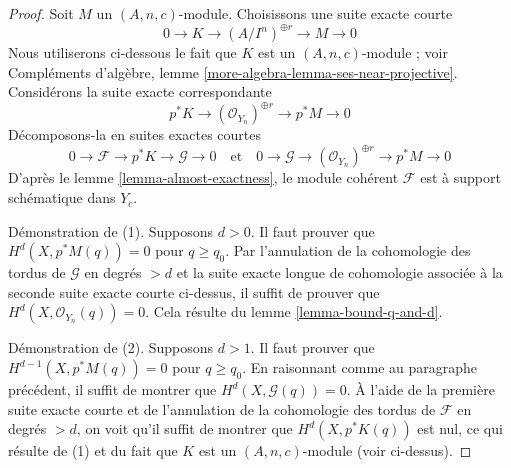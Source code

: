 \begin{proof}
Soit $M$ un $(A, n, c)$-module. Choisissons une suite exacte courte
$$
0 \to K \to (A/I^n)^{\oplus r} \to M \to 0
$$
Nous utiliserons ci-dessous le fait que $K$ est un $(A, n, c)$-module ; voir Compléments d'algèbre, lemme \ref{more-algebra-lemma-ses-near-projective}. Considérons la suite exacte correspondante
$$
p^*K \to (\mathcal{O}_{Y_n})^{\oplus r} \to p^*M \to 0
$$
Décomposons-la en suites exactes courtes
$$
0 \to \mathcal{F} \to p^*K \to \mathcal{G} \to 0
\quad\text{et}\quad
0 \to \mathcal{G} \to (\mathcal{O}_{Y_n})^{\oplus r} \to p^*M \to 0
$$
D'après le lemme \ref{lemma-almost-exactness}, le module cohérent $\mathcal{F}$ est à support schématique dans $Y_c$.

\medskip\noindent
Démonstration de (1). Supposons $d > 0$. Il faut prouver que $H^d(X, p^*M(q)) = 0$ pour $q \geq q_0$. Par l'annulation de la cohomologie des tordus de $\mathcal{G}$ en degrés $> d$ et la suite exacte longue de cohomologie associée à la seconde suite exacte courte ci-dessus, il suffit de prouver que $H^d(X, \mathcal{O}_{Y_n}(q)) = 0$. Cela résulte du lemme \ref{lemma-bound-q-and-d}.

\medskip\noindent
Démonstration de (2). Supposons $d > 1$. Il faut prouver que $H^{d - 1}(X, p^*M(q)) = 0$ pour $q \geq q_0$. En raisonnant comme au paragraphe précédent, il suffit de montrer que $H^d(X, \mathcal{G}(q)) = 0$. À l'aide de la première suite exacte courte et de l'annulation de la cohomologie des tordus de $\mathcal{F}$ en degrés $> d$, on voit qu'il suffit de montrer que $H^d(X, p^*K(q))$ est nul, ce qui résulte de (1) et du fait que $K$ est un $(A, n, c)$-module (voir ci-dessus).


\end{proof}
